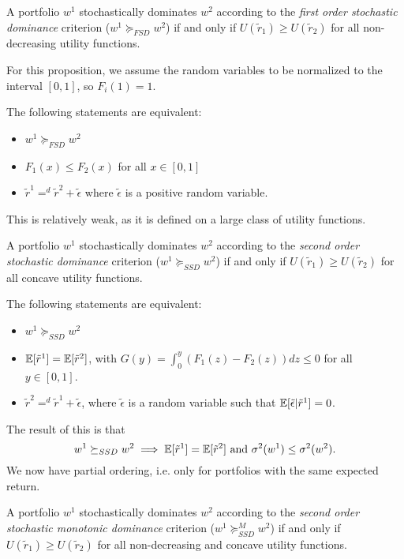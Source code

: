 \documentclass[twoside, titlepage]{article}
\begin{document}
\begin{definition}
    A portfolio $w^1$ stochastically dominates $w^2$ according to the \textit{first order stochastic dominance} criterion ($w^1 \succeq_{FSD} w^2$) if and only if $U(\tilde{r}_1) \geq U(\tilde{r}_2)$ for all non-decreasing utility functions.
\end{definition}

For this proposition, we assume the random variables to be normalized to the interval $[0, 1]$, so $F_i(1) = 1$.
\begin{proposition}
    The following statements are equivalent:
    \begin{itemize}
        \item $w^1 \succeq_{FSD} w^2$
        \item $F_1(x) \leq F_2(x)$ for all $x \in [0, 1]$
        \item $\tilde{r}^1 =^d \tilde{r}^2 + \tilde{\epsilon}$ where $\tilde{\epsilon}$ is a positive random variable.
    \end{itemize}
\end{proposition}
This is relatively weak, as it is defined on a large class of utility functions.
\begin{definition}
    A portfolio $w^1$ stochastically dominates $w^2$ according to the \textit{second order stochastic dominance} criterion ($w^1 \succeq_{SSD} w^2$) if and only if $U(\tilde{r}_1) \geq U(\tilde{r}_2)$ for all concave utility functions.
\end{definition}

\begin{proposition}
    The following statements are equivalent:
    \begin{itemize}
        \item $w^1 \succeq_{SSD} w^2$
        \item $\mathbb{E}[\tilde{r}^1] = \mathbb{E}[\tilde{r}^2]$, with $G(y) = \int_0^y\left(F_1(z) - F_2(z)\right) dz \leq 0$ for all $y \in [0, 1]$.
        \item $\tilde{r}^2 =^d \tilde{r}^1 + \tilde{\epsilon}$, where $\tilde{\epsilon}$ is a random variable such that $\mathbb{E}[\tilde{\epsilon} | \tilde{r}^1] = 0$.
    \end{itemize}
\end{proposition}
The result of this is that
\[
    w^1 \succeq_{SSD} w^2 \implies \mathbb{E}[\tilde{r}^1] = \mathbb{E}[\tilde{r}^2] \text{ and } \sigma^2(w^1) \leq \sigma^2(w^2).
\]
We now have partial ordering, i.e. only for portfolios with the same expected return.
\begin{definition}
    A portfolio $w^1$ stochastically dominates $w^2$ according to the \textit{second order stochastic monotonic dominance} criterion ($w^1 \succeq_{SSD}^M w^2$) if and only if $U(\tilde{r}_1) \geq U(\tilde{r}_2)$ for all non-decreasing and concave utility functions.
\end{definition}
\end{document}
